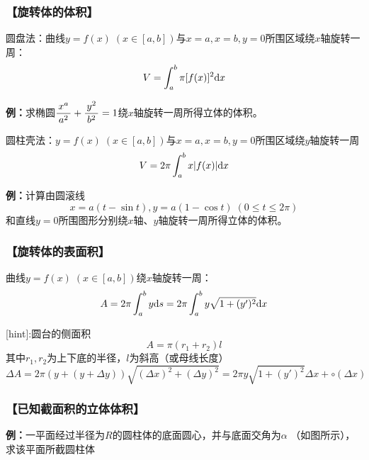 \subsubsection{【旋转体的体积】}

圆盘法：曲线$y=f(x)\;(x\in[a,b])$与$x=a,x=b,y=0$所围区域绕$x$轴旋转一周：
$$V=\displaystyle\int_a^b\pi[f(x)]^2\mathrm{d} x$$

{\bf 例：}求椭圆$\displaystyle\frac{\,{x^a}\,}{\,{a^2}\,}+\displaystyle\frac{\,{y^2}\,}{\,{b^2}\,}=1$绕$x$轴旋转一周所得立体的体积。

圆柱壳法：$y=f(x)\;(x\in[a,b])$与$x=a,x=b,y=0$所围区域绕$y$轴旋转一周
$$V=2\pi\displaystyle\int_a^bx|f(x)|\mathrm{d} x$$

{\bf 例：}计算由圆滚线$$x=a(t-\sin t),y=a(1-\cos t)\;(0\leq t\leq 2\pi)$$
和直线$y=0$所围图形分别绕$x$轴、$y$轴旋转一周所得立体的体积。

\subsubsection{【旋转体的表面积】}
曲线$y=f(x)\;(x\in[a,b])$绕$x$轴旋转一周：
$$A=2\pi \displaystyle\int_a^by\mathrm{d} s=2\pi \displaystyle\int_a^by\sqrt{1+(y')^2}\mathrm{d} x$$

[hint]:圆台的侧面积
$$A=\pi(r_1+r_2)l$$
其中$r_1,r_2$为上下底的半径，$l$为斜高（或母线长度）
$$\Delta A=2\pi(y+(y+\Delta y))\sqrt{(\Delta x)^2+(\Delta y)^2}
=2\pi y\sqrt{1+(y')^2}\Delta x+\circ(\Delta x)$$

\subsubsection{【已知截面积的立体体积】}

{\bf 例：}一平面经过半径为$R$的圆柱体的底面圆心，并与底面交角为$\alpha$
（如图所示），求该平面所截圆柱体

\begin{center}
\end{center}

